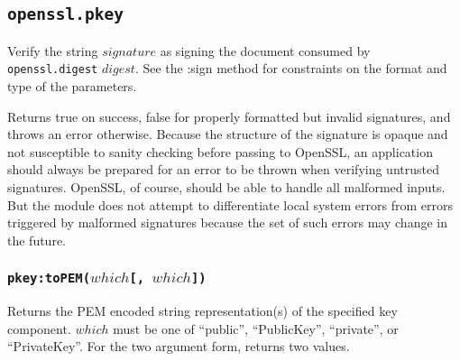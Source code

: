 \documentclass[11pt, oneside]{memoir}
\newcommand*{\fn}[1]{\texttt{#1}\xspace}
\newcommand*{\module}[1]{\texttt{#1}\xspace}
\newcounter{toccols}
\newenvironment{Module}[1]{
	\subsection{\texttt{#1}}
	\addtocontents{toc}{
		\protect\begin{multicols}{\value{toccols}}
	}
}{
	\addtocontents{toc}{\protect\end{multicols}}
}
\begin{document}
\begin{Module}{openssl.pkey}
Verify the string $signature$ as signing the document consumed by \module{openssl.digest} $digest$. See the :sign method for constraints on the format and type of the parameters.

Returns true on success, false for properly formatted but invalid signatures, and throws an error otherwise. Because the structure of the signature is opaque and not susceptible to sanity checking before passing to OpenSSL, an application should always be prepared for an error to be thrown when verifying untrusted signatures. OpenSSL, of course, should be able to handle all malformed inputs. But the module does not attempt to differentiate local system errors from errors triggered by malformed signatures because the set of such errors may change in the future.

\subsubsection[\fn{pkey:toPEM}]{\fn{pkey:toPEM($which$[, $which$])}}

Returns the PEM encoded string representation(s) of the specified key component. $which$ must be one of ``public'', ``PublicKey'', ``private'', or ``PrivateKey''. For the two argument form, returns two values.

\end{Module}
\end{document}
